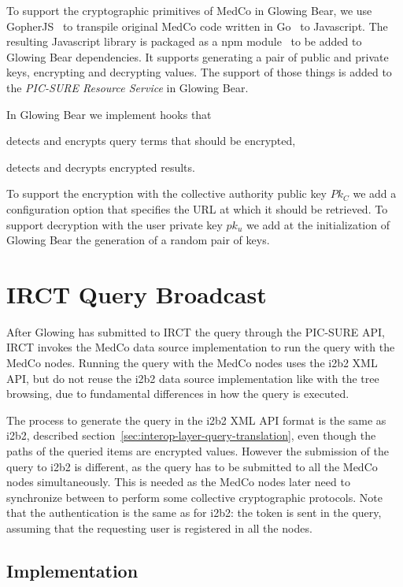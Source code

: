 To support the cryptographic primitives of MedCo in Glowing Bear, we use GopherJS~\cite{todo} to transpile original MedCo code written in Go~\cite{todo} to Javascript.
The resulting Javascript library is packaged as a npm module~\cite{todo} to be added to Glowing Bear dependencies.
It supports generating a pair of public and private keys, encrypting and decrypting values.
The support of those things is added to the \emph{PIC-SURE Resource Service} in Glowing Bear.

In Glowing Bear we implement hooks that 
\begin{enumerate*}
    \item detects and encrypts query terms that should be encrypted,
    \item detects and decrypts encrypted results.
\end{enumerate*}
To support the encryption with the collective authority public key $Pk_C$ we add a configuration option that specifies the URL at which it should be retrieved.
To support decryption with the user private key $pk_u$ we add at the initialization of Glowing Bear the generation of a random pair of keys.


\section{IRCT Query Broadcast}

After Glowing has submitted to IRCT the query through the PIC-SURE API, IRCT invokes the MedCo data source implementation to run the query with the MedCo nodes.
Running the query with the MedCo nodes uses the i2b2 XML API, but do not reuse the i2b2 data source implementation like with the tree browsing, due to fundamental differences in how the query is executed.

The process to generate the query in the i2b2 XML API format is the same as i2b2, described section~\ref{sec:interop-layer-query-translation}, even though the paths of the queried items are encrypted values.
However the submission of the query to i2b2 is different, as the query has to be submitted to all the MedCo nodes simultaneously.
This is needed as the MedCo nodes later need to synchronize between to perform some collective cryptographic protocols.
Note that the authentication is the same as for i2b2: the token is sent in the query, assuming that the requesting user is registered in all the nodes.


\subsection*{Implementation}

